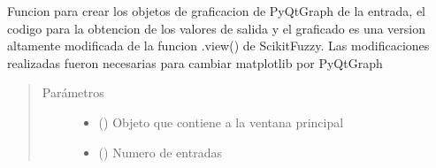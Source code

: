 \documentclass[letterpaper,10pt,spanish]{sphinxmanual}
\begin{document}
\begin{fulllineitems}
\begin{fulllineitems}
\begin{quote}
\begin{description}
\end{description}\end{quote}

\end{fulllineitems}


\begin{fulllineitems}
\label{\detokenize{codigos/rutinas_fuzzy:rutinas_fuzzy.FuzzyController.crear_plots_in}}
Funcion para crear los objetos de graficacion de PyQtGraph de la entrada, el codigo para la obtencion de los valores de salida y el graficado es una version altamente modificada de la funcion .view() de Scikit\sphinxhyphen{}Fuzzy. Las modificaciones realizadas fueron necesarias para cambiar matplotlib por PyQtGraph
\begin{quote}\begin{description}
\item[{Parámetros}] \leavevmode\begin{itemize}
\item {} 
 () \textendash{} Objeto que contiene a la ventana principal

\item {} 
 () \textendash{} Numero de entradas

\end{itemize}

\end{description}\end{quote}

\end{fulllineitems}



\end{fulllineitems}
\end{document}
